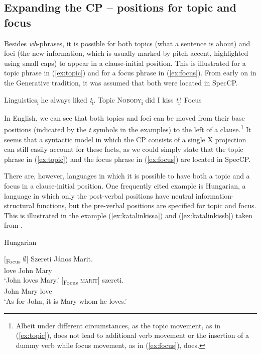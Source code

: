 \subsection{Expanding the CP -- positions for topic and focus}\label{expanding}
Besides \textit{wh}-phrases, it is possible for both topics (what a sentence is about) and foci (the new information, which is usually marked by pitch accent, highlighted using small caps) to appear in a clause-initial position. This is illustrated for a topic phrase in (\ref{ex:topic}) and for a focus phrase in (\ref{ex:focus}). From early on in the Generative tradition, it was assumed that both were located in SpecCP.

\begin{exe}
\ex\begin{xlist} 
\ex Linguistics\textsubscript{i} he always liked \textit{t}\textsubscript{i}. \hfill Topic \label{ex:topic}
\ex \textsc{Nobody}\textsubscript{i} did I kiss \textit{t}\textsubscript{i}! \hfill Focus \label{ex:focus}
\end{xlist}
\end{exe}

\noindent In English, we can see that both topics and foci can be moved from their base positions (indicated by the \textit{t} symbols in the examples) to the left of a clause.\footnote{Albeit under different circumstances, as the topic movement, as in (\ref{ex:topic}), does not lead to additional verb movement or the insertion of a dummy verb while focus movement, as in (\ref{ex:focus}), does.} It seems that a syntactic model in which the CP consists of a single $\overline{\textrm{X}}$ projection can still easily account for these facts, as we could simply state that the topic phrase in (\ref{ex:topic}) and the focus phrase in (\ref{ex:focus}) are located in SpecCP. 

There are, however, languages in which it is possible to have both a topic and a focus in a clause-initial position. One frequently cited example is Hungarian, a language in which only the post-verbal positions have neutral information-structural functions, but the pre-verbal positions are specified for topic and focus. This is illustrated in the example (\ref{ex:katalinkissa}) and (\ref{ex:katalinkissb}) taken from \citet{kiss1981structural}.


\begin{exe}
\ex Hungarian \citep{kiss1981structural} \begin{xlist} 
\ex {} {$[$\textsubscript{Focus} $\emptyset ]$} {Szereti} {János} {Marit.} \\
{} {} {love} {John} {Mary} \\
\trans `John loves Mary.' \label{ex:katalinkissa}
\ex {} {$[$\textsubscript{Focus} \textsc{marit}$]$} {szereti.}  \\
{\hspace*{\fill} John} {Mary} {love}  \\
\trans `As for John, it is Mary whom he loves.' \label{ex:katalinkissb}
\end{xlist}
\end{exe}

